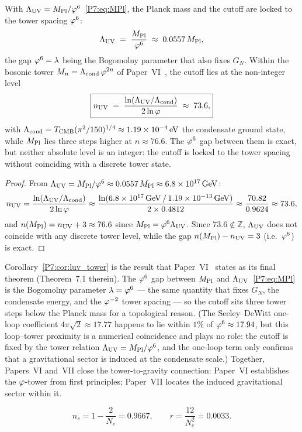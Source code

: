 \begin{corollary}
\label{P7:cor:luv_tower}
With $\Lambda_{\mathrm{UV}}=M_{\mathrm{Pl}}/\varphi^6$~\eqref{P7:eq:MPl}, the Planck mass and the
cutoff are locked to the tower spacing $\varphi^6$:
\begin{equation}
  \Lambda_{\mathrm{UV}} \;=\; \frac{M_{\mathrm{Pl}}}{\varphi^6}\;\approx\;0.0557\,M_{\mathrm{Pl}},
  \label{P7:eq:LUV_from_MPl}
\end{equation}
the gap $\varphi^6=\lambda$ being the Bogomolny parameter that also fixes
$G_N$. Within the bosonic tower $M_n = \Lambda_{\mathrm{cond}}\,\varphi^{2n}$ of
Paper~VI~\cite{Paper6}, the cutoff lies at the non-integer level
\begin{equation}
  \boxed{n_{\mathrm{UV}}
  \;=\; \frac{\ln(\Lambda_{\mathrm{UV}}/\Lambda_{\mathrm{cond}})}{2\ln\varphi}
  \;\approx\; 73.6,}
  \label{P7:eq:nUV_formula}
\end{equation}
with $\Lambda_{\mathrm{cond}} = T_{\mathrm{CMB}}(\pi^2/150)^{1/4}\approx1.19\times10^{-4}\,\mathrm{eV}$
the condensate ground state, while $M_{\mathrm{Pl}}$ lies three steps higher at
$n\approx76.6$. The $\varphi^6$ gap between them is exact, but neither
absolute level is an integer: the cutoff is locked to the tower
spacing without coinciding with a discrete tower state.
\end{corollary}
\begin{proof}
From $\Lambda_{\mathrm{UV}}=M_{\mathrm{Pl}}/\varphi^6\approx0.0557\,M_{\mathrm{Pl}}\approx6.8\times10^{17}\,\mathrm{GeV}$:
\[
  n_{\mathrm{UV}}
  = \frac{\ln(\Lambda_{\mathrm{UV}}/\Lambda_{\mathrm{cond}})}{2\ln\varphi}
  \approx \frac{\ln(6.8\times10^{17}\,\mathrm{GeV}\,/\,1.19\times10^{-13}\,\mathrm{GeV})}{2\times0.4812}
  \approx \frac{70.82}{0.9624}
  \approx 73.6,
\]
and $n(M_{\mathrm{Pl}})=n_{\mathrm{UV}}+3\approx76.6$ since $M_{\mathrm{Pl}}=\varphi^6\Lambda_{\mathrm{UV}}$.
Since $73.6\notin\mathbb{Z}$, $\Lambda_{\mathrm{UV}}$ does not coincide with any
discrete tower level, while the gap $n(M_{\mathrm{Pl}})-n_{\mathrm{UV}}=3$
(i.e.\ $\varphi^6$) is exact.
\end{proof}

\begin{remark}
\label{P7:rem:bogomolny_coincidence}
Corollary~\ref{P7:cor:luv_tower} is the result that Paper~VI~\cite{Paper6}
states as its final theorem (Theorem~7.1 therein). The $\varphi^6$ gap
between $M_{\mathrm{Pl}}$ and $\Lambda_{\mathrm{UV}}$~\eqref{P7:eq:MPl} is the Bogomolny parameter
$\lambda=\varphi^6$ --- the same quantity that fixes $G_N$, the condensate
energy, and the $\varphi^{-2}$ tower spacing --- so the cutoff sits three
tower steps below the Planck mass for a topological reason. (The
Seeley--DeWitt one-loop coefficient $4\pi\sqrt{2}\approx17.77$ happens
to lie within $1\%$ of $\varphi^6\approx17.94$, but this loop--tower
proximity is a numerical coincidence and plays no role: the cutoff is
fixed by the tower relation $\Lambda_{\mathrm{UV}}=M_{\mathrm{Pl}}/\varphi^6$, and the one-loop term
only confirms that a gravitational sector is induced at the
condensate scale.) Together, Papers~VI and~VII close the
tower-to-gravity connection: Paper~VI establishes the $\varphi$-tower from
first principles; Paper~VII locates the induced gravitational sector
within it.
\end{remark}

\begin{equation}
  n_s = 1 - \frac{2}{N_e} = 0.9667,
  \qquad
  r = \frac{12}{N_e^2} = 0.0033.
  \label{P7:eq:inflation_predictions}
\end{equation}
